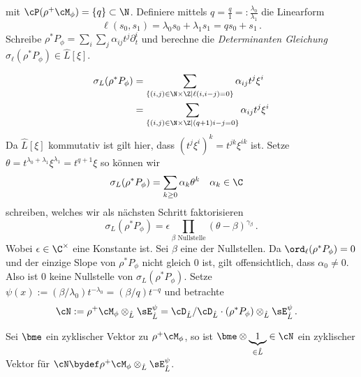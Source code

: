 mit $\cP(\rho^+\cM_\phi)=\{q\}\subset\N$. Definiere mittels
$q=\frac{q}{1}=:\frac{\lambda_0}{\lambda_1}$ die  Linearform
\[
\ell(s_0,s_1)=\lambda_0s_0+\lambda_1s_1=qs_0+s_1 \,.
\]
Schreibe $\rho^*P_{\phi}=\sum_i\sum_j\alpha_{ij}t^j\partial_t^i$ und berechne
die \emph{Determinanten Gleichung} $\sigma_\ell(\rho^*P_{\phi})\in \hat L[\xi]$.
\begin{comment}
Schon gezeigt, das $ord_\ell = 0$?
\end{comment}
\begin{align*}
\sigma_L(\rho^*P_{\phi})
  &= \sum_{\{(i,j)\in\N\times\Z \mid \ell(i,i-j)=0\}}\alpha_{ij}t^j\xi^i\\
  &= \sum_{\{(i,j)\in\N\times\Z \mid (q+1)i-j=0\}}\alpha_{ij}t^j\xi^i
\end{align*}
Da $\hat L[\xi]$ kommutativ ist gilt hier, dass $(t^j\xi^i)^k=t^{jk}\xi^{ik}$ ist.
Setze $\theta=t^{\lambda_0+\lambda_1}\xi^{\lambda_1}=t^{q+1}\xi$ so können wir
\begin{align*}
\sigma_L(\rho^*P_{\phi}) &= \sum_{k\geq 0}\alpha_k\theta^k & & \alpha_k\in\C
\end{align*}
schreiben, welches wir als nächsten Schritt faktorisieren
\[
\sigma_L(\rho^*P_\phi)=\epsilon\prod_{\beta\mbox{ Nullstelle}}(\theta-\beta)^{\gamma_\beta}\,.
\]
Wobei $\epsilon\in\C^\times$ eine Konstante ist.
Sei $\beta$  eine der Nullstellen.
Da $\ord_\ell(\rho^*P_\phi)=0$ und der einzige Slope von $\rho^*P_\phi$ nicht
gleich $0$ ist, gilt offensichtlich, dass $\alpha_0\neq0$. Also ist $0$ keine
Nullstelle von $\sigma_L(\rho^*P_\phi)$.
Setze $\psi(x):=(\beta/\lambda_0)t^{-\lambda_0}=(\beta/q)t^{-q}$ und
betrachte
\begin{align*}
\cN:=\rho^+\cM_\phi\otimes_{\hat L}\sE_{\hat L}^\psi
  &= \cD_{\hat L}/\cD_{\hat L}\cdot(\rho^*P_{\phi})
    \otimes_{\hat L}\sE_{\hat L}^\psi \,.
\end{align*}
\begin{lem}
Sei $\bme$ ein zyklischer Vektor zu $\rho^+\cM_\phi$, so ist $\bme\otimes
\underset{\in\hat L}{\underbrace{1}}\in\cN$ ein zyklischer Vektor für
$\cN\bydef\rho^+\cM_\phi\otimes_{\hat L}\sE_{\hat L}^\psi$.
\end{lem}

